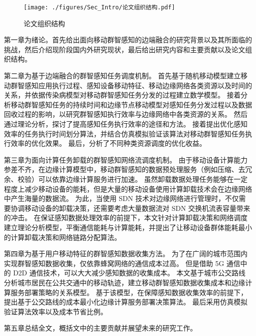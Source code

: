 \begin{figure}[!h]
\vspace{-0.8em}
\centering
  \texttt{[image: ./figures/Sec\_Intro/论文组织结构.pdf]}
  \caption{论文组织结构}
  \vspace{-1em}
  \label{Figure_Re_Instruction}
\end{figure}

第一章为绪论。首先给出面向移动群智感知的边端融合的研究背景以及其所面临的挑战，然后介绍现阶段国内外研究现状，最后给出研究内容和主要贡献以及论文组织结构。

第二章为基于边端融合的群智感知任务调度机制。
首先基于随机移动模型建立移动群智感知应用执行过程、感知设备移动特征、移动边缘网络各类资源以及时间的关系，并依据传染病模型对移动群智感知任务分发的过程建立数学模型。
接着分析移动群智感知任务的持续时间和边缘节点移动模型对感知任务分发过程以及数据回收过程的影响，以研究群智感知执行效率与边缘网络中各类资源的关系。
然后通过理论分析，探讨了提高感知任务执行效率的途径和方法。
接着提出优化感知效率的任务执行时间划分算法，并结合仿真模拟验证该算法对移动群智感知任务执行效率的优化效果。
最后，分析了不同种类资源调度的优化收益。

第三章为面向计算任务卸载的群智感知网络流调度机制。
由于移动设备计算能力参差不齐，在边缘计算模型中，移动群智感知的数据预处理服务（例如压缩、去冗余、校验）可以依靠边缘计算服务进行加速。
虽然卸载数据处理任务能够在一定程度上减少移动设备的能耗，但是大量的移动设备使用计算卸载技术会在边缘网络中产生海量的数据流。
为此，当使用 SDN 技术对边缘网络进行管理时，不仅需要协调移动设备的卸载决策，还需要考虑大量数据流对 SDN 交换机流表容量带来的冲击。
在保证感知数据处理效率的前提下，本文针对计算卸载决策和网络调度建立理论分析模型，平衡通信能耗与计算能耗，并提出了让移动设备群体能耗最小的计算卸载决策和网络链路分配算法。

第四章为基于用户移动特征的群智感知数据收集方法。
为了在广阔的城市范围内实现群智感知数据收集，仅依靠蜂窝网络的通信成本过高。
但是借助 5G 通信中的 D2D 通信技术，可以大大减少感知数据的收集成本。
本文基于城市公交路线分析城市居民在公共交通中的移动轨迹，建立移动群智感知数据收集成本和边缘计算服务部署策略的关系模型。
基于该模型，在保障感知数据收集效率的前提下，提出基于公交路线的成本最小化边缘计算服务部署决策算法。
最后采用仿真模拟验证算法效率以及成本节省比例。

第五章总结全文，概括文中的主要贡献并展望未来的研究工作。
